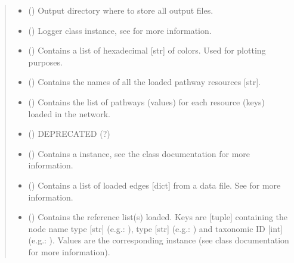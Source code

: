 \documentclass[letterpaper,10pt,english]{sphinxmanual}
\begin{document}
\begin{fulllineitems}
\begin{quote}
\begin{description}
\begin{itemize}
\item {} 
 () \textendash{} Output directory where to store all output files.

\item {} 
 () \textendash{} Logger class instance, see  for more
information.

\item {} 
 () \textendash{} Contains a list of hexadecimal {[}str{]} of colors. Used for
plotting purposes.

\item {} 
 () \textendash{} Contains the names of all the loaded pathway resources {[}str{]}.

\item {} 
 () \textendash{} Contains the list of pathways (values) for each resource (keys)
loaded in the network.

\item {} 
 () \textendash{} DEPRECATED (?)

\item {} 
 () \textendash{} Contains a 
instance, see the class documentation for more information.

\item {} 
 () \textendash{} Contains a list of loaded edges {[}dict{]} from a data file. See
{\hyperref[\detokenize{main:pypath.main.PyPath.read_data_file}]{}} for more information.

\item {} 
 () \textendash{} Contains the reference list(s) loaded. Keys are {[}tuple{]}
containing the node name type {[}str{]} (e.g.: ), type
{[}str{]} (e.g.: ) and taxonomic ID {[}int{]} (e.g.:
). Values are the corresponding
 instance (see class
documentation for more information).


\end{itemize}
\end{description}
\end{quote}
\end{fulllineitems}
\end{document}

